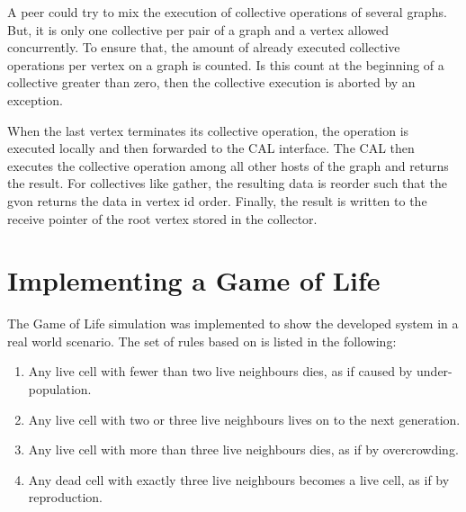
A peer could try to mix the execution of collective operations of
several graphs. But, it is only one collective per pair of a graph and
a vertex allowed concurrently. To ensure that, the amount of already
executed collective operations per vertex on a graph is counted.  Is
this count at the beginning of a collective greater than zero, then
the collective execution is aborted by an exception.

When the last vertex terminates its collective operation, the
operation is executed locally and then forwarded to the CAL
interface. The CAL then executes the collective operation among all
other hosts of the graph and returns the result. For collectives like
gather, the resulting data is reorder such that the gvon returns the
data in vertex id order. Finally, the result is written to the receive
pointer of the root vertex stored in the collector.



\section{Implementing a Game of Life}
The Game of Life simulation was implemented to show the developed
system in a real world scenario. The set of rules based on \cite{ref:gol_rules}
is listed in the following:

\begin{enumerate}
\item Any live cell with fewer than two live neighbours dies, as if caused by under-population.
\item Any live cell with two or three live neighbours lives on to the next generation.
\item Any live cell with more than three live neighbours dies, as if by overcrowding.
\item Any dead cell with exactly three live neighbours becomes a live cell, as if by reproduction.
\end{enumerate}

